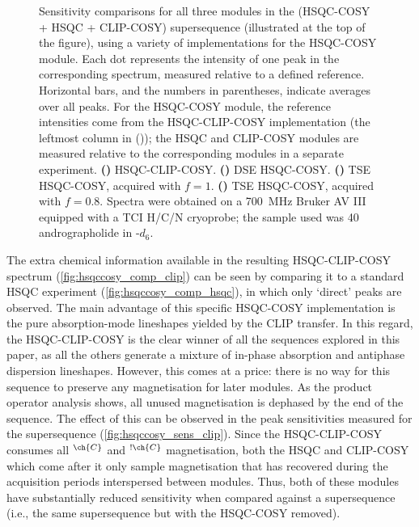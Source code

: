 \documentclass[a4paper,12pt]{article}
\newcommand{\magn}[1]{\ch{^1H}$^{\ch{#1}}$}
\newcommand{\magnnot}[1]{\ch{^1H}$^{!\ch{#1}}$}
\newcommand{\andro}{Spectra were obtained on a \SI{700}{\MHz} Bruker AV III equipped with a TCI H/C/N cryoprobe; the sample used was \SI{40}{\milli\molar} andrographolide in \ch{DMSO}-$d_6$.}
\begin{document}
\begin{refsection}
\begin{figure}[!ht]
{        Sensitivity comparisons for all three modules in the  (HSQC-COSY + HSQC + CLIP-COSY) supersequence (illustrated at the top of the figure), using a variety of implementations for the HSQC-COSY module.
        Each dot represents the intensity of one peak in the corresponding spectrum, measured relative to a defined reference.
        Horizontal bars, and the numbers in parentheses, indicate averages over all peaks.
        For the HSQC-COSY module, the reference intensities come from the HSQC-CLIP-COSY implementation (the leftmost column in ()); the HSQC and CLIP-COSY modules are measured relative to the corresponding modules in a separate  experiment.
        \textbf{()} HSQC-CLIP-COSY.
        \textbf{()} DSE HSQC-COSY.
        \textbf{()} TSE HSQC-COSY, acquired with $f = 1$.
        \textbf{()} TSE HSQC-COSY, acquired with $f = 0.8$.
        \andro{}
    }
    \label{fig:hsqccosy_sens}
\end{figure}

The extra chemical information available in the resulting HSQC-CLIP-COSY spectrum (\cref{fig:hsqccosy_comp_clip}) can be seen by comparing it to a standard HSQC experiment (\cref{fig:hsqccosy_comp_hsqc}), in which only `direct' peaks are observed.
The main advantage of this specific HSQC-COSY implementation is the pure absorption-mode lineshapes yielded by the CLIP transfer.
In this regard, the HSQC-CLIP-COSY is the clear winner of all the sequences explored in this paper, as all the others generate a mixture of in-phase absorption and antiphase dispersion lineshapes.
However, this comes at a price: there is no way for this sequence to preserve any magnetisation for later modules.
As the product operator analysis shows, all unused magnetisation is dephased by the end of the sequence.
The effect of this can be observed in the peak sensitivities measured for the  supersequence (\cref{fig:hsqccosy_sens_clip}).
Since the HSQC-CLIP-COSY consumes all \magn{C} and \magnnot{C} magnetisation, both the HSQC and CLIP-COSY which come after it only sample magnetisation that has recovered during the acquisition periods interspersed between modules.
Thus, both of these modules have substantially reduced sensitivity when compared against a  supersequence (i.e., the same supersequence but with the HSQC-COSY removed).


\end{refsection}
\end{document}

